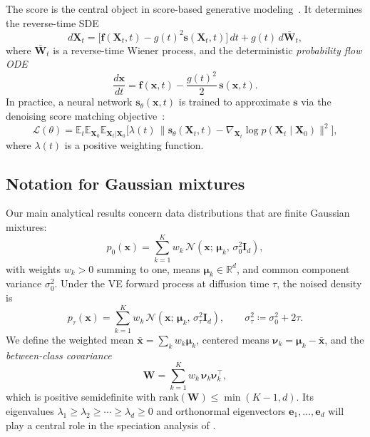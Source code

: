 \documentclass[11pt]{article}
\newcommand{\R}{\mathbb{R}}
\newcommand{\E}{\mathbb{E}}
\newcommand{\rank}{\mathrm{rank}}
\begin{document}
The score is the central object in score-based generative modeling~\citep{song2019generative, hyvarinen2005estimation}.
It determines the reverse-time SDE~\citep{anderson1982reverse}
\begin{equation}\label{eq:reverse-sde}
  d\bm{X}_t = \bigl[\bm{f}(\bm{X}_t,t) - g(t)^2 \bm{s}(\bm{X}_t,t)\bigr]\,dt + g(t)\,d\bar{\bm{W}}_t,
\end{equation}
where $\bar{\bm{W}}_t$ is a reverse-time Wiener process, and the deterministic \emph{probability flow ODE}~\citep{song2021score}
\begin{equation}\label{eq:prob-flow}
  \frac{d\bm{x}}{dt} = \bm{f}(\bm{x},t) - \frac{g(t)^2}{2}\,\bm{s}(\bm{x},t).
\end{equation}
In practice, a neural network $\bm{s}_\theta(\bm{x},t)$ is trained to approximate $\bm{s}$ via the denoising score matching objective~\citep{vincent2011connection, song2021score}:
\begin{equation}\label{eq:dsm}
  \mathcal{L}(\theta)
  = \E_{t}\E_{\bm{X}_0}\E_{\bm{X}_t | \bm{X}_0}
    \bigl[\lambda(t)\,\|\bm{s}_\theta(\bm{X}_t, t) - \nabla_{\bm{X}_t}\log p(\bm{X}_t \mid \bm{X}_0)\|^2\bigr],
\end{equation}
where $\lambda(t)$ is a positive weighting function.

\subsection{Notation for Gaussian mixtures}\label{sec:prelim:gmm}

Our main analytical results concern data distributions that are finite Gaussian mixtures:
\begin{equation}\label{eq:gmm-def}
  p_0(\bm{x}) = \sum_{k=1}^K w_k\,\mathcal{N}(\bm{x};\,\bm{\mu}_k,\,\sigma_0^2 \bm{I}_d),
\end{equation}
with weights $w_k > 0$ summing to one, means $\bm{\mu}_k \in \R^d$, and common component variance $\sigma_0^2$.
Under the VE forward process at diffusion time $\tau$, the noised density is
\begin{equation}\label{eq:gmm-noised}
  p_\tau(\bm{x}) = \sum_{k=1}^K w_k\,\mathcal{N}(\bm{x};\,\bm{\mu}_k,\,\sigma_\tau^2 \bm{I}_d),
  \qquad \sigma_\tau^2 \coloneqq \sigma_0^2 + 2\tau.
\end{equation}
We define the weighted mean $\bar{\bm{x}} = \sum_k w_k \bm{\mu}_k$, centered means $\bm{\nu}_k = \bm{\mu}_k - \bar{\bm{x}}$, and the \emph{between-class covariance}
\begin{equation}\label{eq:W-def}
  \bm{W} = \sum_{k=1}^K w_k\,\bm{\nu}_k \bm{\nu}_k^\top,
\end{equation}
which is positive semidefinite with $\rank(\bm{W}) \leq \min(K-1, d)$.
Its eigenvalues $\lambda_1 \geq \lambda_2 \geq \cdots \geq \lambda_d \geq 0$ and orthonormal eigenvectors $\bm{e}_1, \ldots, \bm{e}_d$ will play a central role in the speciation analysis of .
\end{document}

